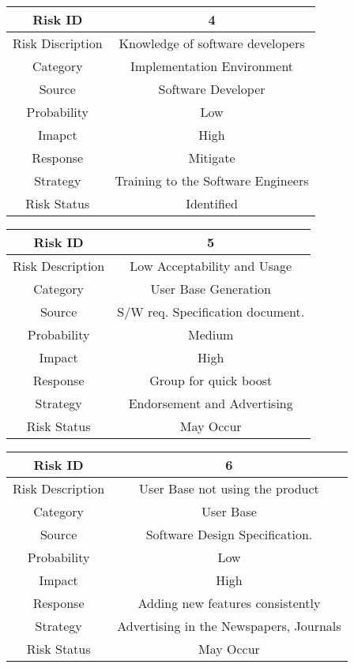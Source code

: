 \documentclass[10pt,a4paper]
{article}
\numberwithin{table}{section}
\begin{document}
{{\begin{normalsize}
\begin{center}
\def\arraystretch{1.5}
\begin{tabular}{|c|c|}
\hline 
Risk ID & 4 \\ 
\hline 
Risk Discription & Knowledge of software developers \\ 
\hline 
Category & Implementation Environment \\ 
\hline 
Source & Software Developer \\ 
\hline 
Probability & Low \\ 
\hline 
Imapct & High \\ 
\hline 
Response & Mitigate \\ 
\hline 
Strategy & Training to the Software Engineers\\ 
\hline 
Risk Status & Identified \\ 
\hline 
\end{tabular}
\end{center}

\begin{center}
\def\arraystretch{1.5}
\begin{tabular}{| c | c |}
\hline 
Risk ID	& 5 \\ \hline
Risk Description	& Low Acceptability and Usage \\ \hline
Category	& User Base Generation \\ \hline
Source	& S/W req. Specification document. \\ \hline
Probability	& Medium \\ \hline
Impact	& High \\ \hline
Response	& Group for quick boost \\ \hline
Strategy	& Endorsement and Advertising \\ \hline
Risk Status	& May Occur \\ \hline
\end{tabular}
\end{center}
\label{tab:risk1}


\begin{center}
\def\arraystretch{1.9}
\begin{tabular}{| c | c |}
\hline 
Risk ID	& 6 \\ \hline
Risk Description	& User Base not using the product \\ \hline
Category	& User Base  \\ \hline
Source	& Software Design Specification. \\ \hline
Probability	& Low \\ \hline
Impact	& High \\ \hline
Response	& Adding new features consistently \\ \hline
Strategy	& Advertising in the  Newspapers, Journals  \\ \hline
Risk Status	& May Occur \\ \hline
\end{tabular}
\end{center}
\label{tab:risk2}


\end{normalsize}}}
\end{document}
